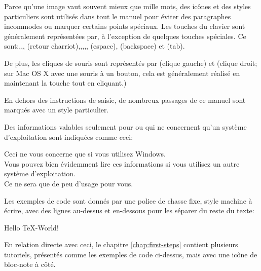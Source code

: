 Parce qu'une image vaut souvent mieux que mille mots, des icônes et des styles particuliers sont utilisés dans tout le manuel pour éviter des paragraphes incommodes ou marquer certains points spéciaux. Les touches du clavier sont généralement représentées par, à l'exception de quelques touches spéciales. Ce sont:,,, (retour charriot),,,,, (espace), (backspace) et  (tab).

De plus, les cliques de souris sont représentés par {\LMB} (clique gauche) et {\RMB} (clique droit; sur Mac OS X avec une souris à un bouton, cela est généralement réalisé en maintenant la touche {\Ctrl} tout en cliquant.)

En dehors des instructions de saisie, de nombreux passages de ce manuel sont marqués avec un style particulier.

Des informations valables seulement pour ou qui ne concernent qu'un système d'exploitation sont indiquées comme ceci:
\begin{OSWindows}
\noindent Ceci ne vous concerne que si vous utilisez Windows. \\
Vous pouvez bien évidemment lire ces informations si vous utilisez un autre système d'exploitation. \\
Ce ne sera que de peu d'usage pour vous.
\end{OSWindows}

\bigskip
Les exemples de code sont donnés par une police de chasse fixe, style machine à écrire, avec des lignes au-dessus et en-dessous pour les séparer du reste du texte:
\begin{verbExample}
Hello \TeX-World!
\end{verbExample}

En relation directe avec ceci, le chapitre \ref{chap:first-steps} contient plusieurs tutoriels, présentés comme les exemples de code ci-dessus, mais avec une icône de bloc-note à côté.